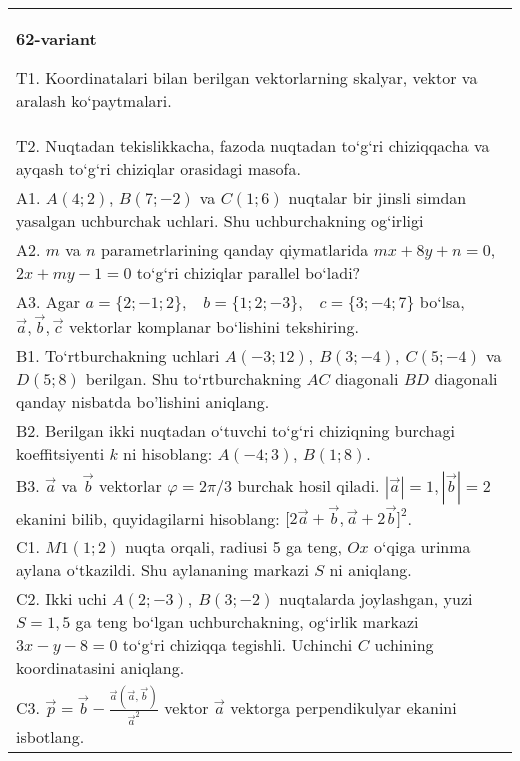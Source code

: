 \documentclass{article}
\begin{document}
\begin{tabular}{m{17cm}}
\textbf{62-variant}
\newline

T1. 
Koordinatalari bilan berilgan vektorlarning skalyar, vektor va aralash ko‘paytmalari. \\
T2. 
Nuqtadan tekislikkacha, fazoda nuqtadan to‘g‘ri chiziqqacha va ayqash to‘g‘ri chiziqlar orasidagi masofa. \\
A1. 
$A (4;2) $, $B (7;-2) $ va $C (1;6) $ nuqtalar bir jinsli
simdan yasalgan uchburchak uchlari. Shu uchburchakning og‘irligi
 \\
A2. 
$m$ va $n$ parametrlarining qanday qiymatlarida
$mx+8y+n=0$, $2x+my-1=0$ to‘g‘ri chiziqlar parallel bo‘ladi?
 \\
A3. 
Agar \(a = \{ 2; - 1;2\}, \ \ \ \ b = \{ 1;2; - 3\}, \ \ \ \ c = \{ 3; - 4;7\}\) bo‘lsa, $\overrightarrow{a}, \overrightarrow{b}, \overrightarrow{c}$ vektorlar komplanar bo‘lishini tekshiring. \\
B1. 
To‘rtburchakning uchlari
\(A (-3;12),\ B (3;-4),\ C (5;-4) \) va \(D (5;8) \) berilgan. Shu
to‘rtburchakning $AC$ diagonali $BD$ diagonali qanday
nisbatda bo'lishini aniqlang.
 \\
B2. 
Berilgan ikki nuqtadan o‘tuvchi to‘g‘ri chiziqning burchagi
koeffitsiyenti $k$ ni hisoblang: $A (-4;3) $, $B (1;8) $.
 \\
B3. 
$\vec{a}$ va $\vec{b}$ vektorlar $\varphi = 2\pi/3$ burchak hosil qiladi. $|\vec{a}| = 1,|\vec{b}| = 2$ ekanini bilib, quyidagilarni hisoblang:
$\lbrack 2\overrightarrow{a} + \overrightarrow{b},\overrightarrow{a} + 2\overrightarrow{b}\rbrack^{2}$.
 \\
C1. 
\(M{1} (1; 2) \) nuqta orqali, radiusi 5 ga teng,
$Ox$ o‘qiga urinma aylana o‘tkazildi. Shu aylananing markazi
$S$ ni aniqlang.
 \\
C2. 
Ikki uchi \(A (2; - 3),\ B (3; - 2) \) nuqtalarda
joylashgan, yuzi \(S = 1,5\) ga teng bo‘lgan uchburchakning,
og‘irlik markazi \(3x - y - 8 = 0\) to‘g‘ri chiziqqa tegishli. Uchinchi $C$
uchining koordinatasini aniqlang.
 \\
C3. 
\(\vec{p} = \vec{b} - \frac{\vec{a} (\vec{a},\vec{b}) }{{\vec{a}}^{2}}\) vektor \(\vec{a}\) vektorga perpendikulyar ekanini isbotlang.
 \\

\end{tabular}
\vspace{1cm}
\end{document}
